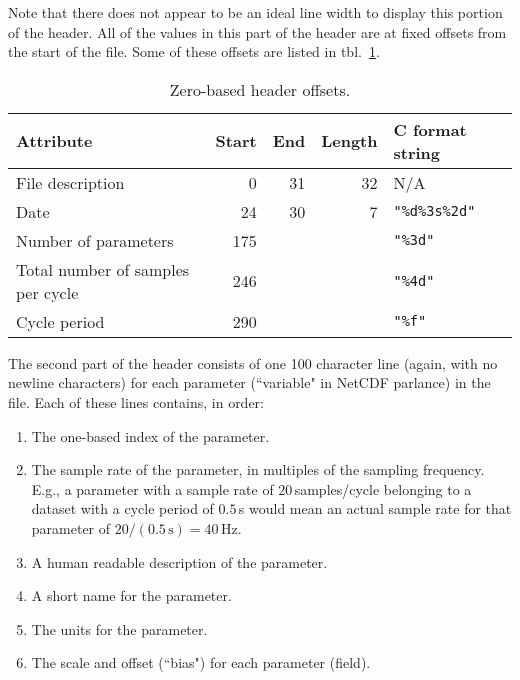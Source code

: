 \documentclass{report}
\begin{document}
Note that there does not appear to be an ideal line width to display this portion of the header. All of the values in this part of the header are at fixed offsets from the start of the file. Some of these offsets are listed in tbl.~\ref{Tbl.HeaderOffsets}.

\begin{table}[H]
\centering
\caption{Zero-based header offsets.}
\label{Tbl.HeaderOffsets}
\begin{tabular}{lrrrl}
Attribute                         & Start & End & Length & C format string \\
\hline
File description                  & 0     & 31  & 32     & N/A \\
Date                              & 24    & 30  & 7      & \texttt{"\%d\%3s\%2d"} \\
Number of parameters              & 175   &     &        & \texttt{"\%3d"} \\
Total number of samples per cycle & 246   &     &        & \texttt{"\%4d"} \\
Cycle period                      & 290   &     &        & \texttt{"\%f"}
\end{tabular}
\end{table}

The second part of the header consists of one 100 character line (again, with no newline characters) for each parameter (``variable" in NetCDF parlance) in the file. Each of these lines contains, in order:
\begin{enumerate}
	\item The one-based index of the parameter.
	\item The sample rate of the parameter, in multiples of the sampling
	      frequency. E.g., a parameter with a sample rate of
	      \(20\)\,samples/cycle belonging to a dataset with a cycle period
	      of \(0.5\)\,s would mean an actual
	      sample rate for that parameter of \(20/(0.5\,\mathrm{s}) = 40\,\text{Hz}\).
	\item A human readable description of the parameter.
	\item A short name for the parameter.
	\item The units for the parameter.
	\item The scale and offset (``bias") for each parameter (field).
\end{enumerate}
\end{document}
